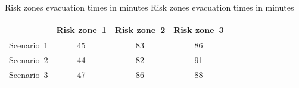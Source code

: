 \createtable%
{Risk zones evacuation times in minutes}%
{Risk zones evacuation times in minutes}%
{\label{tab:aliaga_tab2}}%
{%
  \begin{tabular}[c]{|l|c|c|c|}
    \hline
		& \textbf{Risk zone~1} & \textbf{Risk zone~2} & \textbf{Risk zone~3} \\
		\hline
    Scenario~1 & 45 & 83 & 86 \\
		Scenario~2 & 44 & 82 & 91 \\
		Scenario~3 & 47 & 86 & 88 \\
    \hline
  \end{tabular}
}%
{}

